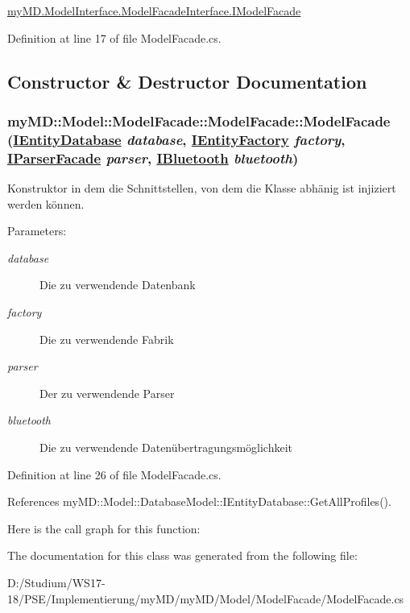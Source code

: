 \hyperlink{interfacemy_m_d_1_1_model_interface_1_1_model_facade_interface_1_1_i_model_facade}{my\-MD.Model\-Interface.Model\-Facade\-Interface.IModel\-Facade} 



Definition at line 17 of file Model\-Facade.cs.

\subsection{Constructor \& Destructor Documentation}
\hypertarget{classmy_m_d_1_1_model_1_1_model_facade_1_1_model_facade_4061b342caa469526c255dfc7f68e440}{
\subsubsection[ModelFacade]{\setlength{\rightskip}{0pt plus 5cm}my\-MD::Model::Model\-Facade::Model\-Facade::Model\-Facade (\hyperlink{interfacemy_m_d_1_1_model_1_1_database_model_1_1_i_entity_database}{IEntity\-Database} {\em database}, \hyperlink{interfacemy_m_d_1_1_model_1_1_entity_factory_1_1_i_entity_factory}{IEntity\-Factory} {\em factory}, \hyperlink{interfacemy_m_d_1_1_model_1_1_parser_model_1_1_i_parser_facade}{IParser\-Facade} {\em parser}, \hyperlink{interfacemy_m_d_1_1_model_1_1_transmission_model_1_1_i_bluetooth}{IBluetooth} {\em bluetooth})}}
\label{d5/dc0/classmy_m_d_1_1_model_1_1_model_facade_1_1_model_facade_4061b342caa469526c255dfc7f68e440}


Konstruktor in dem die Schnittstellen, von dem die Klasse abh\"{a}nig ist injiziert werden k\"{o}nnen. 

\begin{Desc}
\item[Parameters:]
\begin{description}
\item[{\em database}]Die zu verwendende Datenbank\item[{\em factory}]Die zu verwendende Fabrik\item[{\em parser}]Der zu verwendende Parser\item[{\em bluetooth}]Die zu verwendende Daten\"{u}bertragungsm\"{o}glichkeit\end{description}
\end{Desc}


Definition at line 26 of file Model\-Facade.cs.

References my\-MD::Model::Database\-Model::IEntity\-Database::Get\-All\-Profiles().

Here is the call graph for this function:

The documentation for this class was generated from the following file:\begin{CompactItemize}
\item 
D:/Studium/WS17-18/PSE/Implementierung/my\-MD/my\-MD/Model/Model\-Facade/Model\-Facade.cs\end{CompactItemize}
